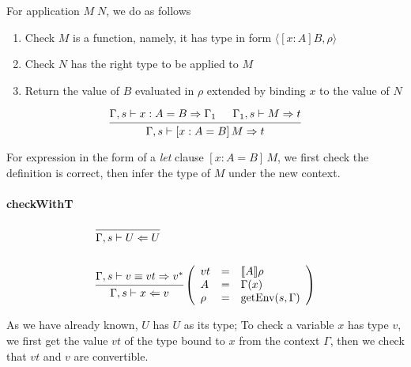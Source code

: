 \documentclass{article}
\theoremstyle{remark}
\begin{document}
For application $M \; N$, we do as follows
\begin{enumerate}
  \item Check $M$ is a function, namely, it has type in form $\langle [x : A] B, \rho \rangle$
  \item Check $N$ has the right type to be applied to $M$
  \item Return the value of $B$ evaluated in $\rho$ extended by binding $x$ to the value of $N$ 
\end{enumerate}

\begin{align}
  \begin{prooftree}
    \hypo{\Gamma,s \vdash x : A = B \Rightarrow \Gamma_1}
    \hypo{\Gamma_1,s \vdash M \Rightarrow t}
    \infer2{\Gamma,s \vdash [x : A = B]\,M \Rightarrow t}
  \end{prooftree}
\end{align}

For expression in the form of a \emph{let} clause $[x : A = B] \, M$, we first check the definition is correct, then infer the type of $M$ under the new context.

\paragraph{checkWithT}
\begin{align}
  &\begin{prooftree}
    \infer0{\Gamma,s \vdash U \Leftarrow U}
  \end{prooftree} \\
  \nonumber \\
  &\begin{prooftree}
    \hypo{\Gamma,s \vdash v \equiv vt \Rightarrow v^*}
    \infer1{\Gamma,s \vdash x \Leftarrow v}
  \end{prooftree}\left(\begin{array}{l l l}
                         vt &= & \llbracket A \rrbracket \rho \\
                         A &= & \Gamma(x) \\
                         \rho &= & \text{getEnv}(s, \Gamma)
                       \end{array}\right)
\end{align}

As we have already known, $U$ has $U$ as its type; To check a variable $x$ has type $v$, we first get the value $vt$ of the type bound to $x$ from the context $\Gamma$, then we check that $vt$ and $v$ are convertible.
\end{document}
